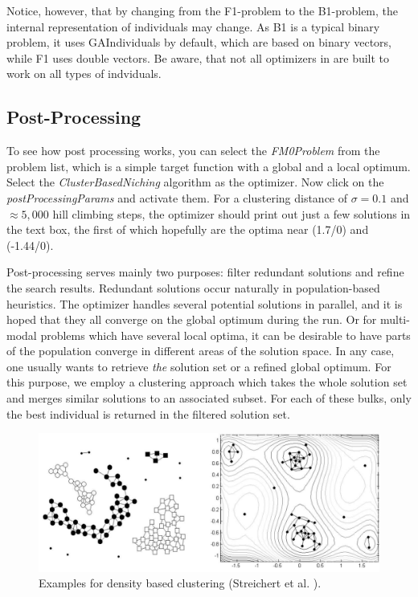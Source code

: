 Notice, however, that by changing from the F1-problem to the B1-problem,
the internal representation of individuals may change. As B1 is a
typical binary problem, it uses GAIndividuals by default, which are
based on binary vectors, while F1 uses double vectors. Be aware, that
not all optimizers in  are built to work on all types of
indviduals.


\subsection{Post-Processing\label{sub:Post-Processing}}

To see how post processing works, you can select the \emph{FM0Problem}
from the problem list, which is a simple target function with a global
and a local optimum. Select the \emph{ClusterBasedNiching} algorithm
as the optimizer. Now click on the \emph{postProcessingParams} and
activate them. For a clustering distance of $\sigma=0.1$ and $\approx5,000$
hill climbing steps, the optimizer should print out just a few solutions
in the text box, the first of which hopefully are the optima near
(1.7/0) and (-1.44/0).

Post-processing serves mainly two purposes: filter redundant solutions
and refine the search results. Redundant solutions occur naturally
in population-based heuristics. The optimizer handles several potential
solutions in parallel, and it is hoped that they all converge on the
global optimum during the run. Or for multi-modal problems which have
several local optima, it can be desirable to have parts of the population
converge in different areas of the solution space. In any case, one
usually wants to retrieve \emph{the} solution set or a refined global
optimum. For this purpose, we employ a clustering approach which takes
the whole solution set and merges similar solutions to an associated
subset. For each of these bulks, only the best individual is returned
in the filtered solution set. 

\begin{figure}
\noindent \begin{centering}
\includegraphics[width=0.8\columnwidth]{pics/cluster-graph}
\par\end{centering}

\caption{Examples for density based clustering (Streichert et al. \cite{streichertClustering03}).\label{fig:Density-based-clustering.}}
\end{figure}



